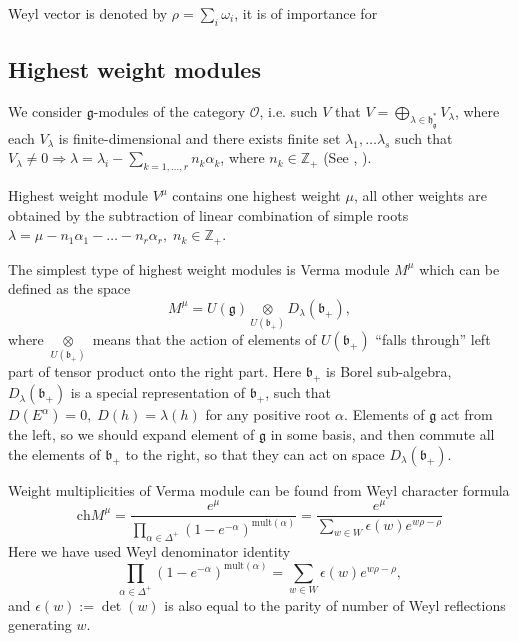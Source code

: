 \documentclass[preprint,12pt]{elsarticle}
\newcommand{\gf}{\mathfrak{g}}
\newcommand{\bff}{\mathfrak{b}}
\newcommand{\hf}{\mathfrak{h}}
\newcommand{\hfg}{\hf_{\gf}}
\begin{document}
Weyl vector is denoted by $\rho=\sum_{i} \omega_{i}$, it is of importance for 
\subsection{Highest weight modules}
\label{sec:high-weight-modul}

We consider $\gf$-modules of the category $\mathcal{O}$, i.e. such $V$ that $V=\bigoplus_{\lambda\in \hfg^{*}} V_{\lambda}$, where each $V_{\lambda}$ is finite-dimensional and there exists finite set $\lambda_{1},\dots \lambda_{s}$ such that $V_{\lambda}\neq 0 \Rightarrow \lambda=\lambda_{i}-\sum_{k=1,\dots, r} n_{k}\alpha_{k}$, where $n_{k}\in \mathbb{Z}_{+}$ (See \cite{humphreys2008representations}, \cite{carter2005lie}).

Highest weight module $V^{\mu}$ contains one highest weight $\mu$, all other weights are obtained by the subtraction of linear combination of simple roots $\lambda=\mu-n_{1}\alpha_{1}-\dots-n_{r}\alpha_{r},\; n_{k}\in \mathbb{Z}_{+}$. 

The simplest type of highest weight modules is Verma module $M^{\mu}$ which can be defined as the space
\begin{equation}
  \label{eq:17}
  M^{\mu}=U(\gf)\underset{U(\bff_{+})}{\otimes} D_{\lambda}(\bff_{+}),
\end{equation}
where $\underset{U(\bff_{+})}{\otimes}$ means that the action of elements of $U(\bff_{+})$ ``falls through'' left part of tensor product onto the right part. Here $\bff_{+}$ is Borel sub-algebra, $D_{\lambda}(\bff_{+})$ is a special representation of $\bff_{+}$, such that $D(E^{\alpha})=0,\; D(h)=\lambda(h)$ for any positive root $\alpha$.
Elements of $\gf$ act from the left, so we should expand element of $\gf$ in some basis, and then commute all the elements of $\bff_{+}$ to the right, so that they can act on space $D_{\lambda}(\bff_{+})$.

Weight multiplicities of Verma module can be found from Weyl character formula
\begin{equation}
  \label{eq:11}
  \mathrm{ch} M^{\mu}=\frac{e^{\mu}}{\prod_{\alpha\in \Delta^{+}} \left( 1-e^{-\alpha}\right)^{\mathrm{mult}(\alpha)}}=\frac{e^{\mu}}{\sum_{w\in W} \epsilon(w) e^{w\rho-\rho}}
\end{equation}
Here we have used Weyl denominator identity
\begin{equation}
  \label{eq:12}
  \prod_{\alpha\in \Delta^{+}} \left( 1-e^{-\alpha}\right)^{\mathrm{mult}(\alpha)}=\sum_{w\in W} \epsilon(w) e^{w\rho-\rho},
\end{equation}
and $\epsilon \left( w\right) :=\det \left( w\right)$ is also equal to the parity of number of Weyl reflections generating $w$.
\end{document}

